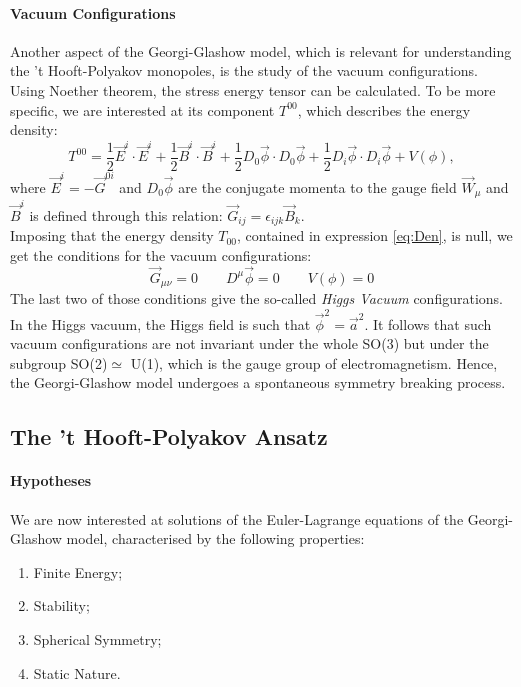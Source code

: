 \documentclass[main.tex]{subfiles}
\begin{document}
\paragraph{Vacuum Configurations}Another aspect of the Georgi-Glashow model, which is relevant for understanding the 't Hooft-Polyakov monopoles, is the study of the vacuum configurations.\\
Using Noether theorem, the stress energy tensor can be calculated. To be more specific, we are interested at its component $T^{00}$, which describes the energy density: 
\begin{equation}
T^{00} = \frac{1}{2} \Vec{E}^i \cdot  \Vec{E}^i + \frac{1}{2} \Vec{B}^i \cdot \Vec{B}^i +\frac{1}{2} D_0 \Vec{\phi} \cdot D_0 \Vec{\phi} +\frac{1}{2} D_i \Vec{\phi} \cdot  D_i \Vec{\phi} + V(\phi),
\label{eq:Den}
\end{equation}
where $\Vec{E}^i = - \Vec{G}^{0i}$ and $D_0 \Vec{\phi}$ are the conjugate momenta to the gauge field $\Vec{W}_{\mu}$ and $\Vec{B}^i$ is defined through this relation: $ \Vec{G}_{ij} = \epsilon_{ijk} \Vec{B}_k$.\\
Imposing that the energy density $T_{00}$, contained in expression \ref{eq:Den}, is null, we get the conditions for the vacuum configurations: 
\begin{equation}
\Vec{G}_{\mu \nu} = 0 \qquad D^{\mu} \Vec{\phi}  = 0 \qquad V(\phi)=0
\end{equation}
The last two of those conditions give the so-called \textit{Higgs Vacuum} configurations. 
In the Higgs vacuum, the Higgs field is such that $\vec{\phi}^2 = \vec{a}^2$. It follows that such vacuum configurations are not invariant under the whole SO(3) but under the subgroup SO(2)$\simeq$ U(1), which is the gauge group of electromagnetism. Hence, the Georgi-Glashow model undergoes a spontaneous symmetry breaking process.

\subsection{The 't Hooft-Polyakov Ansatz}
\label{sect:Ansatz}
 \paragraph{Hypotheses}We are now interested at solutions of the Euler-Lagrange equations of the Georgi-Glashow model, characterised by the following properties: 
 \begin{enumerate}
     \item Finite Energy; 
     \item Stability; 
     \item Spherical Symmetry;
     \item Static Nature.
 \end{enumerate}
 
\end{document}
